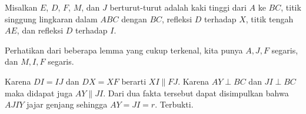     Misalkan $E$, $D$, $F$, $M$, dan $J$ berturut-turut adalah kaki tinggi dari $A$ ke $BC$, titik singgung lingkaran dalam $ABC$ dengan $BC$, refleksi $D$ terhadap $X$, titik tengah $AE$, dan refleksi $D$ terhadap $I$.

    Perhatikan dari beberapa lemma yang cukup terkenal, kita punya $A,J,F$ segaris, dan $M,I,F$ segaris.

    Karena $DI = IJ$ dan $DX = XF$ berarti $XI \parallel FJ$. Karena $AY \perp BC$ dan $JI \perp BC$ maka didapat juga $AY \parallel JI$. Dari dua fakta tersebut dapat disimpulkan bahwa $AJIY$ jajar genjang sehingga $AY = JI = r$. Terbukti.
